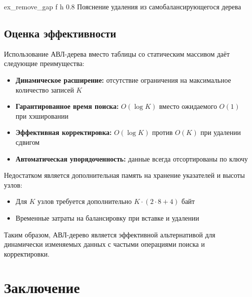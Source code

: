 \documentclass{bmstu}
\begin{document}
        {ex_remove_gap} %
        {f} %
        {h} %
        {0.8\textwidth} %
        {Пояснение удаления из самобалансирующегося дерева} %
    
    \clearpage
    \section{Оценка эффективности}

    Использование АВЛ-дерева вместо таблицы со статическим массивом даёт следующие преимущества:

    \begin{itemize}
        \item \textbf{Динамическое расширение:} отсутствие ограничения на максимальное количество записей $K$
        \item \textbf{Гарантированное время поиска:} $O(\log K)$ вместо ожидаемого $O(1)$ при хэшировании
        \item \textbf{Эффективная корректировка:} $O(\log K)$ против $O(K)$ при удалении сдвигом
        \item \textbf{Автоматическая упорядоченность:} данные всегда отсортированы по ключу
    \end{itemize}

    Недостатком является дополнительная память на хранение указателей и высоты узлов:
    \begin{itemize}
        \item Для $K$ узлов требуется дополнительно $K \cdot (2 \cdot 8 + 4)$ байт
        \item Временные затраты на балансировку при вставке и удалении
    \end{itemize}

    Таким образом, АВЛ-дерево является эффективной альтернативой для динамически изменяемых данных с частыми операциями поиска и корректировки.
    \clearpage

    \chapter{Заключение}
\end{document}
